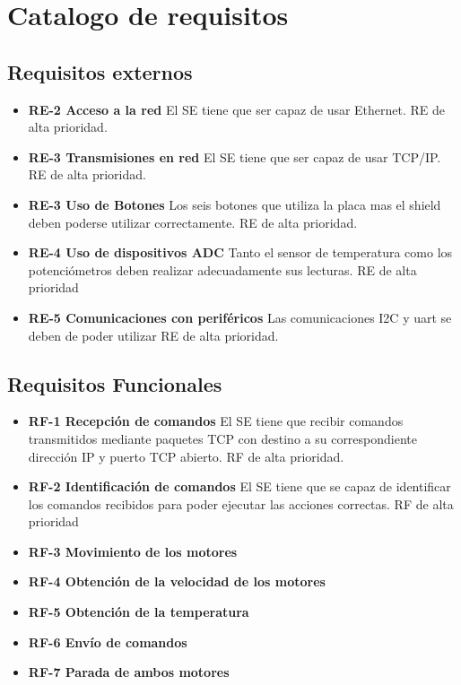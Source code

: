 \section{Catalogo de requisitos}
\subsection{Requisitos externos}
\begin{itemize}
  	
	\item \textbf{RE-2 Acceso a la red} El SE tiene que ser capaz de usar Ethernet. RE de alta prioridad.
	\item \textbf{RE-3 Transmisiones en red} El SE tiene que ser capaz de usar TCP/IP. RE de alta prioridad.
	\item \textbf{RE-3 Uso de Botones} Los seis botones que utiliza la placa mas el shield deben poderse utilizar correctamente.  RE de alta prioridad.
	\item \textbf{RE-4 Uso de dispositivos ADC} Tanto el sensor de temperatura como los potenciómetros deben realizar adecuadamente sus lecturas. RE de alta prioridad
	\item \textbf{RE-5 Comunicaciones con periféricos} Las comunicaciones I2C y uart se deben de poder utilizar RE de alta prioridad.
\end{itemize}

\subsection{Requisitos Funcionales}
\begin{itemize}
  	\item \textbf{RF-1 Recepción de comandos} El SE tiene que recibir comandos transmitidos mediante paquetes TCP con destino a su correspondiente dirección IP y puerto TCP abierto. RF de alta prioridad.
  	\item \textbf{RF-2 Identificación de comandos} El SE tiene que se capaz de identificar los comandos recibidos para poder ejecutar las acciones correctas. RF de alta prioridad
  	\item \textbf{RF-3 Movimiento de los motores}
  	\item \textbf{RF-4 Obtención de la velocidad de los motores}
  	\item \textbf{RF-5 Obtención de la temperatura} 
  	\item \textbf{RF-6 Envío de comandos}
  	\item \textbf{RF-7 Parada de ambos motores}
\end{itemize}

